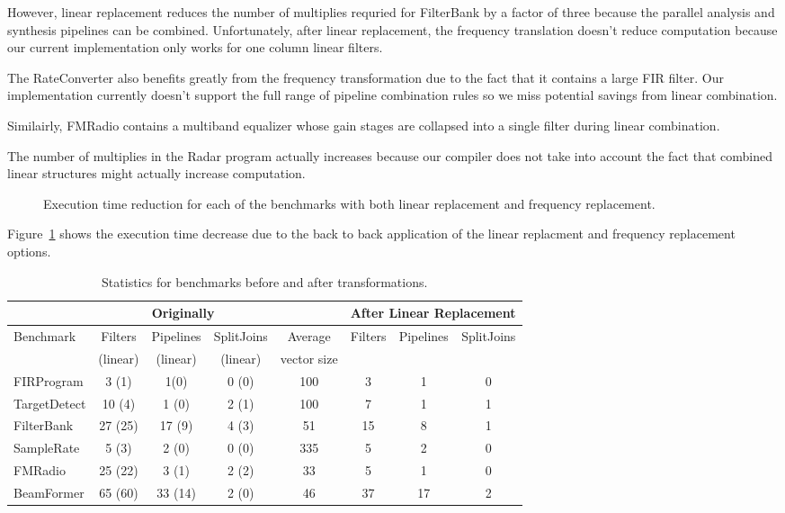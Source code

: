 However, linear replacement reduces the number of multiplies 
requried for FilterBank by a factor of three because the parallel analysis and 
synthesis pipelines can be combined. Unfortunately, after
linear replacement, the frequency translation doesn't reduce computation 
because our current implementation only works for one column linear filters.

The RateConverter also benefits greatly from the frequency
transformation due to the fact that it contains a large FIR
filter. Our implementation currently doesn't support the full range of
pipeline combination rules so we miss potential savings from linear
combination.

Similairly, FMRadio contains a multiband equalizer whose gain stages are collapsed
into a single filter during linear combination.

The number of multiplies in the Radar program actually increases because our 
compiler does not take into account the fact that combined linear structures 
might actually increase computation. %

\begin{figure}
\center
\epsfxsize=3.2in
\vspace{-6pt}
\caption{Execution time reduction for each of the benchmarks with both linear replacement and frequency replacement.}
\label{fig:execution-speedup}
\vspace{-12pt}
\end{figure}

Figure~\ref{fig:execution-speedup} shows the execution time decrease due to the back to back
application of the linear replacment and frequency replacement options.


\begin{table*}[t]
\begin{tabular}{|l|c|c|c||c||c|c|c|} 
\hline
          & \multicolumn{3}{|c||}{Originally}  &             & \multicolumn{3}{|c|}{After Linear Replacement} \\
\hline
Benchmark & Filters & Pipelines & SplitJoins & Average     & Filters      & Pipelines         & SplitJoins \\
          & (linear)& (linear)  & (linear)   & vector size &              &                   &            \\
\hline
FIRProgram & 3 (1) & 1(0) & 0 (0) & 100 & 3 & 1 & 0 \\
\hline
TargetDetect & 10 (4) & 1 (0) & 2 (1) & 100 & 7 & 1 & 1 \\
\hline
FilterBank & 27 (25) & 17 (9) & 4 (3) & 51 & 15 & 8 & 1 \\
\hline
SampleRate & 5 (3) & 2 (0) & 0 (0) & 335 & 5 & 2 & 0 \\
\hline
FMRadio & 25 (22) & 3 (1) & 2 (2) & 33 & 5 & 1 & 0 \\
\hline
BeamFormer & 65 (60) & 33 (14) & 2 (0) & 46 & 37 & 17 & 2\\
\hline
\end{tabular}
\caption{Statistics for benchmarks before and after transformations.}
\label{fig:benchmark-stastics}
\end{table*}
